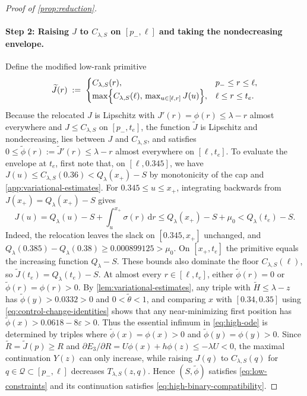 \documentclass[11pt]{article}
\numberwithin{equation}{section}
\theoremstyle{plain}
\theoremstyle{definition}
\newcommand{\1}{\mathbf{1}}
\newcommand{\calQ}{\mathcal{Q}}
\begin{document}
\begin{proof}[Proof of {\cref{prop:reduction}}]
\paragraph{Step 2: Raising $J$ to $C_{\lambda, S}$ on $[p_-, \ell]$ and taking the nondecreasing envelope.}
Define the modified low-rank primitive
\[
  \widetilde{J}(r) \;:=\;
  \begin{cases}
    C_{\lambda, S}(r), & p_- \le r \le \ell, \\
    \max\Bigl\{C_{\lambda, S}(\ell),\, \max_{u \in [\ell, r]} J(u)\Bigr\}, & \ell \le r \le t_e.
  \end{cases}
\]
Because the relocated $J$ is Lipschitz with $J'(r)=\phi(r)\le\lambda-r$ almost everywhere and $J \le C_{\lambda, S}$ on $[p_-, t_e]$, the function $\widetilde{J}$ is Lipschitz and nondecreasing, lies between $J$ and $C_{\lambda, S}$, and satisfies $0 \le \widetilde{\phi}(r) := \widetilde{J}'(r) \le \lambda - r$ almost everywhere on $[\ell, t_e]$. To evaluate the envelope at $t_e$, first note that, on $[\ell,0.345]$, we have $J(u)\le C_{\lambda,S}(0.36)<Q_\lambda(x_+)-S$ by monotonicity of the cap and \cref{app:variational-estimates}. For $0.345\le u\le x_+$, integrating backwards from $J(x_+)=Q_\lambda(x_+)-S$ gives
\[
  J(u)=Q_\lambda(u)-S+\int_u^{x_+}\sigma(r)\,\mathrm{d}r
       \le Q_\lambda(x_+)-S+\mu_0 < Q_\lambda(t_e)-S.
\]
Indeed, the relocation leaves the slack on $[0.345,x_+]$ unchanged, and $Q_\lambda(0.385)-Q_\lambda(0.38)\ge 0.000899125>\mu_0$. On $[x_+,t_e]$ the primitive equals the increasing function $Q_\lambda-S$. These bounds also dominate the floor $C_{\lambda,S}(\ell)$, so $\widetilde J(t_e)=Q_\lambda(t_e)-S$. At almost every $r \in [\ell, t_e]$, either $\widetilde{\phi}(r) = 0$ or $\widetilde{\phi}(r) = \phi(r) > 0$. By \cref{lem:variational-estimates}, any triple with $\widetilde{H} \le \lambda - z$ has $\widetilde{\phi}(y) > 0.0332 > 0$ and $0 < \widetilde{\theta} < 1$, and comparing $x$ with $[0.34, 0.35]$ using \cref{eq:control-change-identities} shows that any near-minimizing first position has $\widetilde{\phi}(x) > 0.0618 - 8\varepsilon > 0$. Thus the essential infimum in \cref{eq:high-ode} is determined by triples where $\widetilde{\phi}(x) = \phi(x) > 0$ and $\widetilde{\phi}(y) = \phi(y) > 0$. Since $\widetilde{R} = \widetilde{J}(p) \ge R$ and $\partial E_3/\partial R = U\phi(x) + h\phi(z) \le -\lambda U < 0$, the maximal continuation $Y(z)$ can only increase, while raising $J(q)$ to $C_{\lambda, S}(q)$ for $q \in \calQ \subset [p_-, \ell]$ decreases $T_{\lambda, S}(z, q)$. Hence $(S, \widetilde{\phi})$ satisfies \cref{eq:low-constraints} and its continuation satisfies \cref{eq:high-binary-compatibility}.
\end{proof}
\end{document}

